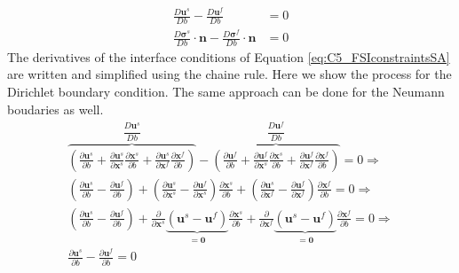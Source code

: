 %
%
\begin{subequations}\label{eq:C5_FSIconstraintsSA}
\begin{align}
	\frac{D \mathbf{u}^s}{D b} - 
	\frac{D \mathbf{u}^f}{D b} &= 0
	\\
	\frac{D \mathbf{\sigma}^s}{D b} \cdot \mathbf{n} - 
	\frac{D \mathbf{\sigma}^f}{D b} \cdot \mathbf{n} &= 0
\end{align}
\end{subequations}
%
The derivatives of the interface conditions of Equation \eqref{eq:C5_FSIconstraintsSA} are written and simplified using the chaine rule. Here we show the process for the Dirichlet boundary condition. The same approach can be done for the Neumann boudaries as well.
%
\begin{gather*}
	\overbrace{	
	\left(
	\frac{\partial \mathbf{u}^s}{\partial b} +
	\frac{\partial \mathbf{u}^s}{\partial \mathbf{x}^s} \frac{\partial \mathbf{x}^s}{\partial b} +
	\frac{\partial \mathbf{u}^s}{\partial \mathbf{x}^f} \frac{\partial \mathbf{x}^f}{\partial b}
	\right)
	}^{\dfrac{D \mathbf{u}^s}{D b}} -
	\overbrace{
	\left(
	\frac{\partial \mathbf{u}^f}{\partial b} +
	\frac{\partial \mathbf{u}^f}{\partial \mathbf{x}^s} \frac{\partial \mathbf{x}^s}{\partial b} +
	\frac{\partial \mathbf{u}^f}{\partial \mathbf{x}^f} \frac{\partial \mathbf{x}^f}{\partial b}
	\right)
	}^{\dfrac{D \mathbf{u}^f}{D b}} = 0 \Longrightarrow
	\\
	\left(
	\frac{\partial \mathbf{u}^s}{\partial b} - \frac{\partial \mathbf{u}^f}{\partial b}
	\right) +
	\left(
	\frac{\partial \mathbf{u}^s}{\partial \mathbf{x}^s} - 
	\frac{\partial \mathbf{u}^f}{\partial \mathbf{x}^s}
	\right) \frac{\partial \mathbf{x}^s}{\partial b} +
	\left(
	\frac{\partial \mathbf{u}^s}{\partial \mathbf{x}^f} - 
	\frac{\partial \mathbf{u}^f}{\partial \mathbf{x}^f}
	\right) \frac{\partial \mathbf{x}^f}{\partial b} = 
	0 \Longrightarrow
	\\
	\left(
	\frac{\partial \mathbf{u}^s}{\partial b} - \frac{\partial \mathbf{u}^f}{\partial b}
	\right) +
	\frac{\partial }{\partial \mathbf{x}^s}
	\underbrace{	
	\left(
	\mathbf{u}^s - \mathbf{u}^f
	\right)
	}_{=\mathbf{0}} \frac{\partial \mathbf{x}^s}{\partial b} +
	\frac{\partial }{\partial \mathbf{x}^f}
	\underbrace{	
	\left(
	\mathbf{u}^s - \mathbf{u}^f
	\right)
	}_{=\mathbf{0}} \frac{\partial \mathbf{x}^f}{\partial b} = 
	0 \Longrightarrow
	\\
	\frac{\partial \mathbf{u}^s}{\partial b} - 
	\frac{\partial \mathbf{u}^f}{\partial b} = 0
\end{gather*}
